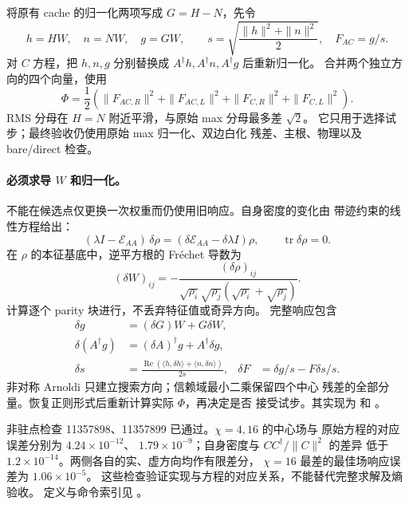将原有 cache 的归一化两项写成 $G=H-N$，先令
\begin{equation}
 h=HW,\quad n=NW,\quad g=GW,\qquad
 s=\sqrt{\frac{\|h\|^2+\|n\|^2}{2}},\quad F_{AC}=g/s.
\end{equation}
对 $C$ 方程，把 $h,n,g$ 分别替换成
$A^\dagger h,A^\dagger n,A^\dagger g$ 后重新归一化。
合并两个独立方向的四个向量，使用
\begin{equation}
 \Phi=\frac12\left(\|F_{AC,R}\|^2+\|F_{AC,L}\|^2
                  +\|F_{C,R}\|^2+\|F_{C,L}\|^2\right).
\end{equation}
RMS 分母在 $H=N$ 附近平滑，与原始 max 分母最多差 $\sqrt2$。
它只用于选择试步；最终验收仍使用原始 max 归一化、双边白化
残差、主根、物理以及 bare/direct 检查。

\paragraph{必须求导 $W$ 和归一化。}
不能在候选点仅更换一次权重而仍使用旧响应。自身密度的变化由
带迹约束的线性方程给出：
\begin{equation}
 (\lambda I-\mathcal E_{AA})\,\delta\rho
 =(\delta\mathcal E_{AA}-\delta\lambda I)\rho,
 \qquad\operatorname{tr}\delta\rho=0.
\end{equation}
在 $\rho$ 的本征基底中，逆平方根的 Fr\'echet 导数为
\begin{equation}
 (\delta W)_{ij}=
 -\frac{(\delta\rho)_{ij}}
 {\sqrt{\rho_i}\sqrt{\rho_j}(\sqrt{\rho_i}+\sqrt{\rho_j})}.
\end{equation}
计算逐个 parity 块进行，不丢弃特征值或奇异方向。
完整响应包含
\begin{align}
 \delta g&=(\delta G)W+G\delta W,\\
 \delta(A^\dagger g)&=(\delta A)^\dagger g+A^\dagger\delta g,\\
 \delta s&=\frac{\operatorname{Re}(\langle h,\delta h\rangle+
                     \langle n,\delta n\rangle)}{2s},&
 \delta F&=\delta g/s-F\delta s/s.
\end{align}
非对称 Arnoldi 只建立搜索方向；信赖域最小二乘保留四个中心
残差的全部分量。恢复正则形式后重新计算实际 $\Phi$，再决定是否
接受试步。其实现为  和
。

非驻点检查 11357898、11357899 已通过。$\chi=4,16$ 的中心场与
原始方程的对应误差分别为 $4.24\times10^{-12}$、
$1.79\times10^{-9}$；自身密度与 $CC^\dagger/\|C\|^2$ 的差异
低于 $1.2\times10^{-14}$。两侧各自的实、虚方向均作有限差分，
$\chi=16$ 最差的最佳场响应误差为 $1.06\times10^{-5}$。
这些检查验证实现与方程的对应关系，不能替代完整求解及熵验收。
定义与命令索引见 。

